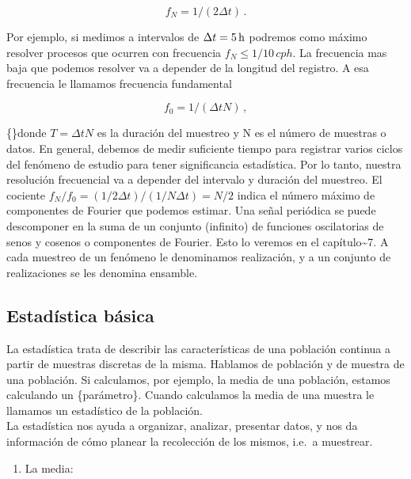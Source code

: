 \documentclass[
]{agujournal2019}
\providecommand{\tightlist}{%
  \setlength{\itemsep}{0pt}\setlength{\parskip}{0pt}}\usepackage{longtable,booktabs,array}
\begin{document}
\[f_N=1/(2\Delta{t})\,.\]

Por ejemplo, si medimos a intervalos de \(\Delta{t}=5\,{\rm h}\)
podremos como máximo resolver procesos que ocurren con frecuencia
\(f_N\le1/10\,{ cph}\). La frecuencia mas baja que podemos resolver va a
depender de la longitud del registro. A esa frecuencia le llamamos
frecuencia fundamental

\[f_0=1/(\Delta{t}N)\,,\]

\{\noindent\}donde \(T=\Delta{t} N\) es la duración del muestreo y N es
el número de muestras o datos. En general, debemos de medir suficiente
tiempo para registrar varios ciclos del fenómeno de estudio para tener
significancia estadística. Por lo tanto, nuestra resolución frecuencial
va a depender del intervalo y duración del muestreo. El cociente
\(f_N/f_0=(1/2\Delta{t})/(1/N\Delta{t})=N/2\) indica el número máximo de
componentes de Fourier que podemos estimar. Una señal periódica se puede
descomponer en la suma de un conjunto (infinito) de funciones
oscilatorias de senos y cosenos o componentes de Fourier. Esto lo
veremos en el capítulo\textasciitilde7. A cada muestreo de un fenómeno
le denominamos realización, y a un conjunto de realizaciones se les
denomina ensamble.

\hypertarget{estaduxedstica-buxe1sica}{%
\subsection{Estadística básica}\label{estaduxedstica-buxe1sica}}

La estadística trata de describir las características de una población
continua a partir de muestras discretas de la misma. Hablamos de
población y de muestra de una población. Si calculamos, por ejemplo, la
media de una población, estamos calculando un \{parámetro\}. Cuando
calculamos la media de una muestra le llamamos un estadístico de la
población.\\

La estadística nos ayuda a organizar, analizar, presentar datos, y nos
da información de cómo planear la recolección de los mismos, i.e.~a
muestrear.

\begin{center}
\end{center}

\vspace{0.5cm}

\begin{enumerate}
\def\labelenumi{\arabic{enumi}.}
\tightlist
\item
  La media:\\
\end{enumerate}
\end{document}
